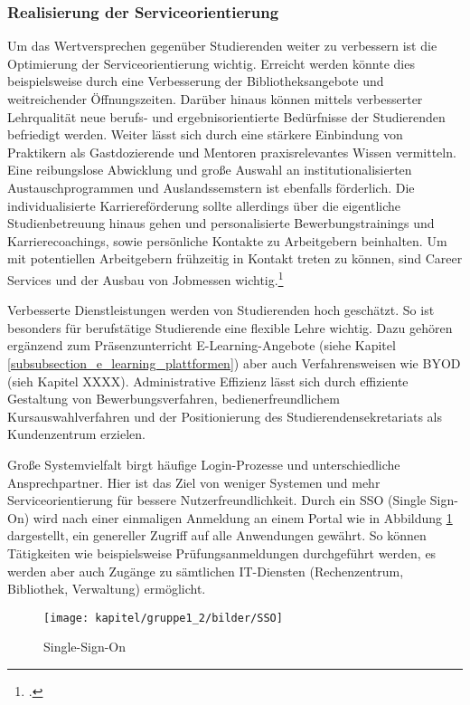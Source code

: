 \subsubsection{Realisierung der Serviceorientierung}
Um das Wertversprechen gegenüber Studierenden weiter zu verbessern ist die Optimierung der Serviceorientierung wichtig. Erreicht werden könnte dies beispielsweise durch eine Verbesserung der Bibliotheksangebote und weitreichender Öffnungszeiten. Darüber hinaus können mittels verbesserter Lehrqualität neue berufs- und ergebnisorientierte Bedürfnisse der Studierenden befriedigt werden. Weiter lässt sich durch eine stärkere Einbindung von Praktikern als Gastdozierende und Mentoren praxisrelevantes Wissen vermitteln. Eine reibungslose Abwicklung und große Auswahl an institutionalisierten Austauschprogrammen und Auslandssemstern ist ebenfalls förderlich. Die individualisierte Karriereförderung sollte allerdings über die eigentliche Studienbetreuung hinaus gehen und personalisierte Bewerbungstrainings und Karrierecoachings, sowie persönliche Kontakte zu Arbeitgebern beinhalten. Um mit potentiellen Arbeitgebern frühzeitig in Kontakt treten zu können, sind Career Services und der Ausbau von Jobmessen wichtig.\footcite{Zitat fehlt}

Verbesserte Dienstleistungen werden von Studierenden hoch geschätzt. So ist besonders für berufstätige Studierende eine flexible Lehre wichtig. Dazu gehören ergänzend zum Präsenzunterricht E-Learning-Angebote (siehe Kapitel \ref{subsubsection_e_learning_plattformen}) aber auch Verfahrensweisen wie BYOD (sieh Kapitel XXXX). Administrative Effizienz lässt sich durch effiziente Gestaltung von Bewerbungsverfahren, bedienerfreundlichem Kursauswahlverfahren und der Positionierung des Studierendensekretariats als Kundenzentrum erzielen.

Große Systemvielfalt birgt häufige Login-Prozesse und unterschiedliche Ansprechpartner. Hier ist das Ziel von weniger Systemen und mehr Serviceorientierung für bessere Nutzerfreundlichkeit. Durch ein SSO (Single Sign-On) wird nach einer einmaligen Anmeldung an einem Portal wie in Abbildung \ref{fig_sso} dargestellt, ein genereller Zugriff auf alle Anwendungen gewährt. So können Tätigkeiten wie beispielsweise Prüfungsanmeldungen durchgeführt werden, es werden aber auch Zugänge zu sämtlichen IT-Diensten (Rechenzentrum, Bibliothek, Verwaltung) ermöglicht.

\begin{figure}[h!]
	\centering
	\texttt{[image: kapitel/gruppe1\_2/bilder/SSO]}
	\caption{Single-Sign-On} 
	\label{fig_sso}
\end{figure}


